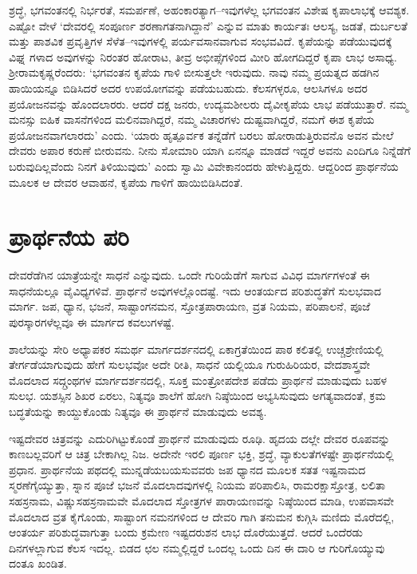 ಶ್ರದ್ಧೆ, ಭಗವಂತನಲ್ಲಿ ನಿರ್ಭರತೆ, ಸಮರ್ಪಣೆ, ಅಹಂಕಾರತ್ಯಾಗ–ಇವುಗಳೆಲ್ಲ ಭಗವಂತನ ವಿಶೇಷ ಕೃಪಾಲಾಭಕ್ಕೆ ಆವಶ್ಯಕ. ಎಷ್ಟೋ ವೇಳೆ ‘ದೇವರಲ್ಲಿ ಸಂಪೂರ್ಣ ಶರಣಾಗತನಾಗಿದ್ದಾನೆ’ ಎನ್ನುವ ಮಾತು ಕಾರ್ಯತಃ ಆಲಸ್ಯ, ಜಡತೆ, ದುರ್ಬಲತೆ ಮತ್ತು ಪಾಶವಿಕ ಪ್ರವೃತ್ತಿಗಳ ಸೆಳೆತ–ಇವುಗಳಲ್ಲಿ ಪರ್ಯವಸಾನವಾಗುವ ಸಂಭವವಿದೆ. ಕೃಪೆಯನ್ನು ಪಡೆಯುವುದಕ್ಕೆ ವಿಘ್ನ ಗಳಾದ ಅವುಗಳನ್ನು ನಿರಂತರ ಹೋರಾಟ, ತೀವ್ರ ಅಭೀಪ್ಸೆಗಳಿಂದ ಮೀರಿ ಹೋಗದಿದ್ದರೆ ಕೃಪಾ ಲಾಭ ಅಸಾಧ್ಯ. ಶ‍್ರೀರಾಮಕೃಷ್ಣರೆಂದರು: ‘ಭಗವಂತನ ಕೃಪೆಯ ಗಾಳಿ ಬೀಸುತ್ತಲೇ ಇರುವುದು. ನಾವು ನಮ್ಮ ಪ್ರಯತ್ನದ ಹಡಗಿನ ಹಾಯಿಯನ್ನೂ ಬಿಡಿಸಿದರೆ ಅದರ ಉಪಯೋಗವನ್ನು ಪಡೆಯಬಹುದು. ಕೆಲಸಗಳ್ಳರೂ, ಆಲಸಿಗಳೂ ಅದರ ಪ್ರಯೋಜನವನ್ನು ಹೊಂದಲಾರರು. ಆದರೆ ದಕ್ಷ ಜನರು, ಉದ್ಯಮಶೀಲರು ದೈವೀಕೃಪೆಯ ಲಾಭ ಪಡೆಯುತ್ತಾರೆ. ನಮ್ಮ ಮನಸ್ಸು ಐಹಿಕ ವಾಸನೆಗಳಿಂದ ಮಲಿನವಾಗಿದ್ದರೆ, ನಮ್ಮ ವಿಚಾರಗಳು ದುಷ್ಟವಾಗಿದ್ದರೆ, ನಮಗೆ ಈಶ ಕೃಪೆಯ ಪ್ರಯೋಜನವಾಗಲಾರದು’ ಎಂದು. ‘ಯಾರು ಹೃತ್ಪೂರ್ವಕ ತನ್ನೆಡೆಗೆ ಬರಲು ಹೋರಾಡುತ್ತಿರುವನೊ ಅವನ ಮೇಲೆ ದೇವರು ಅಪಾರ ಕರುಣೆ ಬೀರುವನು. ನೀನು ಸೋಮಾರಿ ಯಾಗಿ ಏನನ್ನೂ ಮಾಡದೆ ಇದ್ದರೆ ಅವನು ಎಂದಿಗೂ ನಿನ್ನೆಡೆಗೆ ಬರುವುದಿಲ್ಲವೆಂದು ನಿನಗೆ ತಿಳಿಯುವುದು’ ಎಂದು ಸ್ವಾಮಿ ವಿವೇಕಾನಂದರು ಹೇಳುತ್ತಿದ್ದರು. ಆದ್ದರಿಂದ ಪ್ರಾರ್ಥನೆಯ ಮೂಲಕ ಆ ದೇವರ ಆವಾಹನೆ, ಕೃಪೆಯ ಗಾಳಿಗೆ ಹಾಯಿಬಿಡಿಸಿದಂತೆ.


\section{ಪ್ರಾರ್ಥನೆಯ ಪರಿ}

ದೇವರೆಡೆಗಿನ ಯಾತ್ರೆಯನ್ನೇ ಸಾಧನೆ ಎನ್ನುವುದು. ಒಂದೇ ಗುರಿಯೆಡೆಗೆ ಸಾಗುವ ವಿವಿಧ ಮಾರ್ಗಗಳಂತೆ ಈ ಸಾಧನೆಯಲ್ಲೂ ವೈವಿಧ್ಯಗಳಿವೆ. ಪ್ರಾರ್ಥನೆ ಅವುಗಳಲ್ಲೊಂದಷ್ಟೆ. ಇದು ಆಂತರ್ಯದ ಪರಿಶುದ್ಧತೆಗೆ ಸುಲಭವಾದ ಮಾರ್ಗ. ಜಪ, ಧ್ಯಾನ, ಭಜನೆ, ಸಾಷ್ಟಾಂಗನಮನ, ಸ್ತೋತ್ರಪಾರಾಯಣ, ವ್ರತ ನಿಯಮ, ಪರಿಪಾಲನೆ, ಪೂಜೆ ಪುರಸ್ಕಾರಗಳೆಲ್ಲವೂ ಈ ಮಾರ್ಗದ ಕವಲುಗಳಷ್ಟೆ.

ಶಾಲೆಯನ್ನು ಸೇರಿ ಅಧ್ಯಾಪಕರ ಸಮರ್ಥ ಮಾರ್ಗದರ್ಶನದಲ್ಲಿ ಏಕಾಗ್ರತೆಯಿಂದ ಪಾಠ ಕಲಿತಲ್ಲಿ ಉಚ್ಚಶ್ರೇಣಿಯಲ್ಲಿ ತೇರ್ಗಡೆಯಾಗುವುದು ಹೇಗೆ ಸುಲಭವೋ ಅದೇ ರೀತಿ, ಸಾಧನೆ ಯಲ್ಲಿಯೂ ಗುರುಹಿರಿಯರ, ವೇದಶಾಸ್ತ್ರವೇ ಮೊದಲಾದ ಸದ್ಗ್ರಂಥಗಳ ಮಾರ್ಗದರ್ಶನದಲ್ಲಿ, ಸೂಕ್ತ ಮಂತ್ರೋಪದೇಶ ಪಡೆದು ಪ್ರಾರ್ಥನೆ ಮಾಡುವುದು ಬಹಳ ಸುಲಭ. ಯಶಸ್ಸಿನ ಶಿಖರ ಏರಲು, ನಿತ್ಯವೂ ಶಾಲೆಗೆ ಹೋಗಿ ನಿಷ್ಠೆಯಿಂದ ಅಭ್ಯಸಿಸುವುದು ಅಗತ್ಯವಾದಂತೆ, ಕ್ರಮ ಬದ್ಧತೆಯನ್ನು ಕಾಯ್ದುಕೊಂಡು ನಿತ್ಯವೂ ಈ ಪ್ರಾರ್ಥನೆ ಮಾಡುವುದು ಅವಶ್ಯ.

ಇಷ್ಟದೇವರ ಚಿತ್ರವನ್ನು ಎದುರಿಗಿಟ್ಟುಕೊಂಡೆ ಪ್ರಾರ್ಥನೆ ಮಾಡುವುದು ರೂಢಿ. ಹೃದಯ ದಲ್ಲೇ ದೇವರ ರೂಪವನ್ನು ಕಾಣಬಲ್ಲವರಿಗೆ ಆ ಚಿತ್ರ ಬೇಕಾಗಿಲ್ಲ ನಿಜ. ಅದೇನೇ ಇರಲಿ ಪೂರ್ಣ ಭಕ್ತಿ, ಶ್ರದ್ಧೆ, ವ್ಯಾಕುಲತೆಗಳಷ್ಟೇ ಪ್ರಾರ್ಥನೆಯಲ್ಲಿ ಪ್ರಧಾನ. ಪ್ರಾರ್ಥನೆಯ ಪಥದಲ್ಲಿ ಮುನ್ನಡೆಯಬಯಸುವವರು ಜಪ ಧ್ಯಾನದ ಮೂಲಕ ಸತತ ಇಷ್ಟನಾಮದ ಸ್ಮರಣೆಗೈಯ್ಯುತ್ತಾ, ಸ್ನಾನ ಪೂಜೆ ಭಜನೆ ಮೊದಲಾದವುಗಳಲ್ಲಿ ನಿಯಮ ಪರಿಪಾಲಿಸಿ, ರಾಮರಕ್ಷಾಸ್ತೋತ್ರ, ಲಲಿತಾ ಸಹಸ್ರನಾಮ, ವಿಷ್ಣುಸಹಸ್ರನಾಮವೇ ಮೊದಲಾದ ಸ್ತೋತ್ರಗಳ ಪಾರಾಯಣವನ್ನು ನಿಷ್ಠೆಯಿಂದ ಮಾಡಿ, ಉಪವಾಸವೇ ಮೊದಲಾದ ವ್ರತ ಕೈಗೊಂಡು, ಸಾಷ್ಟಾಂಗ ನಮನಗಳಿಂದ ಆ ದೇವರಿ ಗಾಗಿ ತನುಮನ ಕುಗ್ಗಿಸಿ ಮಣಿದು ಮೊರೆದಲ್ಲಿ, ಆಂತರ್ಯ ಪರಿಶುದ್ಧವಾಗುತ್ತಾ ಬಂದು ಕ್ರಮೇಣ ಇಷ್ಟದರುಶನ ಲಾಭ ದೊರೆಯುತ್ತದೆ. ಆದರೆ ಒಂದೆರಡು ದಿನಗಳಲ್ಲಾಗುವ ಕೆಲಸ ಇದಲ್ಲ. ಬಿಡದ ಛಲ ನಮ್ಮಲ್ಲಿದ್ದರೆ ಒಂದಲ್ಲ ಒಂದು ದಿನ ಈ ದಾರಿ ಆ ಗುರಿಗೊಯ್ಯುವು ದಂತೂ ಖಂಡಿತ.


